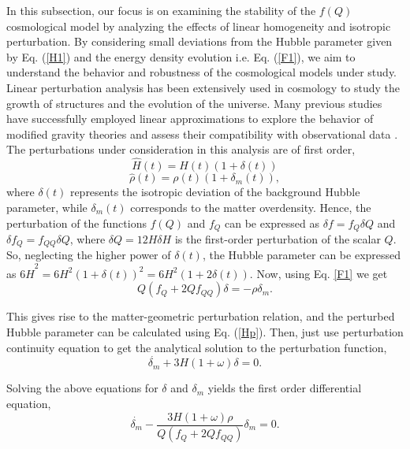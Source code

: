\documentclass[prd,superscriptaddress,amsfonts,amssymb,amsmath,showpacs,twocolumn]{revtex4-2}
\begin{document}
In this subsection, our focus is on examining the stability of the $f(Q)$ cosmological model by analyzing the effects of linear homogeneity and isotropic perturbation. By considering small deviations from the Hubble parameter given by Eq. (\ref{H1}) and the energy density evolution i.e. Eq. (\ref{F1}), we aim to understand the behavior and robustness of the cosmological models under study. Linear perturbation analysis has been extensively used in cosmology to study the growth of structures and the evolution of the universe. Many previous studies have successfully employed linear approximations to explore the behavior of modified gravity theories and assess their compatibility with observational data \cite{Farrugia/2016,Dombriz/2012,Anagnost/2021,Mishra}. The perturbations under consideration in this analysis are of first order,
\begin{equation}
\widehat{H}(t)=H(t)(1+\delta \left( t\right) )  \label{Hp}
\end{equation}%
\begin{equation}
\widehat{\rho}(t)=\rho (t)(1+\delta _{m}\left( t\right) ),
\end{equation}%
where $\delta \left( t\right) $ represents the isotropic deviation of the background Hubble parameter, while $\delta_{m}\left( t\right) $ corresponds to the matter overdensity. Hence, the
perturbation of the functions $f(Q)$ and $f_{Q}$ can be expressed as $\delta
f=f_{Q}\delta Q$ and $\delta f_{Q}=f_{QQ}\delta Q$, where $\delta
Q=12H\delta H$ is the first-order perturbation of the scalar $Q$. So,
neglecting the higher power of $\delta \left( t\right) $, the Hubble
parameter can be expressed as $6\widehat{H}^{2}=6H^{2}\left( 1+\delta \left(
t\right) \right) ^{2}=6H^{2}\left( 1+2\delta \left( t\right) \right) $. Now,
using Eq. \eqref{F1} we get%
\begin{equation}
Q\left( f_{Q}+2Qf_{QQ}\right) \delta =-\rho \delta _{m}.
\end{equation}

This gives rise to the matter-geometric perturbation relation, and the
perturbed Hubble parameter can be calculated using Eq. (\ref{Hp}). Then, just use perturbation continuity equation to get the analytical solution to
the perturbation function,  
\begin{equation}
\dot{\delta _{m}}+3H(1+\omega )\delta =0.
\end{equation}

Solving the above equations for $\delta $ and $\delta _{m}$ yields the first
order differential equation, 
\begin{equation}
\dot{\delta _{m}}-\frac{3H(1+\omega )\rho }{Q(f_{Q}+2Qf_{QQ})}\delta _{m}=0.
\end{equation}
\end{document}
